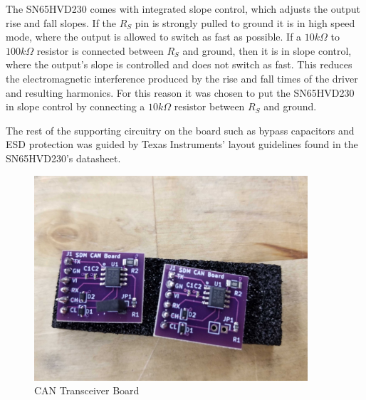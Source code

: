The SN65HVD230 comes with integrated slope control, which adjusts the output rise and fall slopes.
If the $R_S$ pin is strongly pulled to ground it is in high speed mode, where the output is allowed to switch as fast as possible.
If a $10k\Omega$ to $100k\Omega$ resistor is connected between $R_S$ and ground, then it is in slope control, where the output's slope is controlled and does not switch as fast.
This reduces the electromagnetic interference produced by the rise and fall times of the driver and resulting harmonics.
For this reason it was chosen to put the SN65HVD230 in slope control by connecting a $10k\Omega$ resistor between $R_S$ and ground.
\vspace{1em}

The rest of the supporting circuitry on the board such as bypass capacitors and ESD protection was guided by Texas Instruments' layout guidelines found in the SN65HVD230's datasheet.

\begin{figure}[H]
    \centering
    \includegraphics[width=4in]{images/sdmcanboardv1.jpg}
    \caption{CAN Transceiver Board}
    \label{fig:sdmcanboard}
\end{figure}


